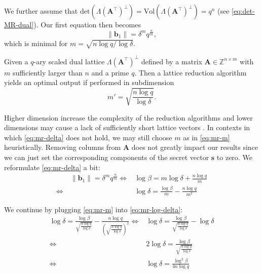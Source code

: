 We further assume that $\text{det}(\Lambda(\mathbf{A}^\intercal)^{\perp}) = \text{Vol}(\Lambda(\mathbf{A}^\intercal)^{\perp}) = q^n$ (see \cref{eq:det-MR-dual}). Our first equation then becomes
\begin{equation}\label{eq:mr-delta}
  \|\mathbf{b}_1\| = \delta^m q^{\frac{n}{m}},
\end{equation}
which is minimal for $m = \sqrt{n \log q / \log \delta}$.
\begin{theorem}
  Given a $q$-ary scaled dual lattice  $\Lambda(\mathbf{A}^\intercal)^{\perp}$ defined by a matrix $\mathbf{A} \in \mathbb{Z}^{n \times m}$ with $m$ sufficiently larger than $n$ and a prime $q$. Then a lattice reduction algorithm yields an optimal output if performed in subdimension
  \begin{equation}
    m' = \sqrt{\frac{n \log q}{\log \delta}}. \label{eq:mr-m}
  \end{equation}
\end{theorem}

Higher dimension increase the complexity of the reduction algorithms and lower dimensions may cause a lack of sufficiently short lattice vectors \cite{MR09}. In contexts in which \cref{eq:mr-delta} does not hold, we may still choose $m$ as in \cref{eq:mr-m} heuristically. Removing columns from $\mathbf{A}$ does not greatly impact our results since we can just set the corresponding components of the secret vector $\mathbf{s}$ to zero. We reformulate \cref{eq:mr-delta} a bit:
\begin{align}
  \qquad\|\mathbf{b}_1\| = \delta^m q^{\frac{n}{m}} \iff & \log \beta = m \log \delta + \frac{n \log q}{m}   \nonumber                       \\
  \iff                                                   & \log \delta = \frac{\log \beta}{m} - \frac{n \log q}{m^2} \label{eq:mr-log-delta}
\end{align}

We continue by plugging \cref{eq:mr-m} into \cref{eq:mr-log-delta}:
\begin{align}
  \log \delta = \frac{\log \beta}{\sqrt{\frac{n \log q}{\log \delta}}} - \frac{n \log q}{\left(\sqrt{\frac{n \log q}{\log \delta}}\right)^2} \iff & \log \delta = \frac{\log \beta}{\sqrt{\frac{n \log q}{\log \delta}}} - \log \delta \nonumber \\
  \iff                                                                                                                                            & 2\log \delta = \frac{\log \beta}{\sqrt{\frac{n \log q}{\log \delta}}}              \nonumber \\
  \iff                                                                                                                                            & \log \delta = \frac{\log^2 \beta}{4n \log q}
\end{align}

